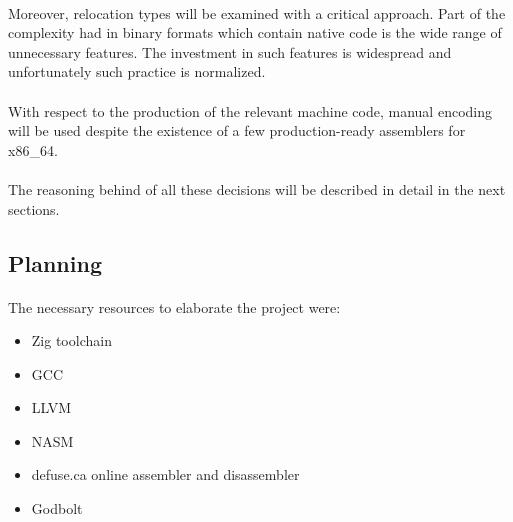 \documentclass[12pt]{article}
\begin{document}
    \paragraph{}Moreover, relocation types will be examined with a critical approach. Part of the complexity had in binary formats which contain native code is the wide range of unnecessary features. The investment in such features is widespread and unfortunately such practice is normalized.
    
    \paragraph{} With respect to the production of the relevant machine code, manual encoding will be used despite the existence of a few production-ready assemblers for x86\_64. 
    
    \paragraph{} The reasoning behind of all these decisions will be described in detail in the next sections.

	\subsection{Planning}
	\paragraph{}The necessary resources to elaborate the project were:
	\begin{itemize}
		\item Zig toolchain\cite{zig}
		\item \acrshort{GCC}\cite{gcc}
		\item \acrshort{LLVM}\cite{llvm}
		\item \acrshort{NASM}\cite{nasm}
		\item defuse.ca online assembler and disassembler\cite{online-assembler}
		\item Godbolt\cite{godbolt}
	\end{itemize}
	
\end{document}
